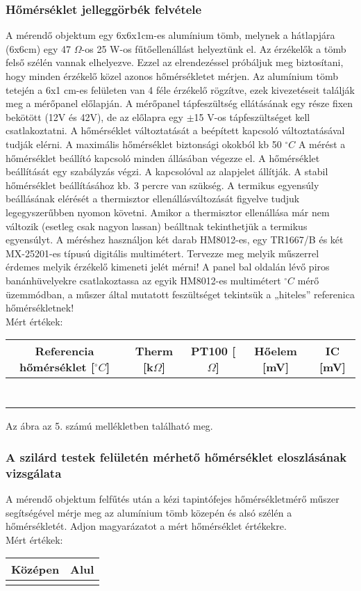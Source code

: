 \documentclass[10pt,a4paper]{article}
\begin{document}
\subsubsection{Hőmérséklet jelleggörbék felvétele}
A mérendő objektum egy 6x6x1cm-es alumínium tömb, melynek
a hátlapjára (6x6cm) egy 47 $\Omega$-os 25 W-os fűtőellenállást
helyeztünk el.
Az érzékelők a tömb felső szélén vannak elhelyezve. Ezzel az
elrendezéssel próbáljuk meg biztosítani, hogy minden érzékelő
közel azonos hőmérsékletet mérjen.
Az alumínium tömb tetején a 6x1 cm-es felületen van 4 féle
érzékelő rögzítve, ezek kivezetéseit találják meg a mérőpanel
előlapján.
A mérőpanel tápfeszültség ellátásának egy része fixen bekötött
(12V és 42V), de az előlapra egy $\pm$15 V-os tápfeszültséget kell
csatlakoztatni.
A hőmérséklet változtatását a beépített kapcsoló változtatásával
tudják elérni.
A maximális hőmérséklet biztonsági okokból kb 50 $^{\circ}C$
A mérést a hőmérséklet beállító kapcsoló minden állásában
végezze el. A hőmérséklet beállítását egy szabályzás végzi. A
kapcsolóval az alapjelet állítják. A stabil hőmérséklet
beállításához kb. 3 percre van szükség. A termikus egyensúly
beállásának elérését a thermisztor ellenállásváltozását figyelve
tudjuk legegyszerűbben nyomon követni. Amikor a thermisztor
ellenállása már nem változik (esetleg csak nagyon lassan)
beálltnak tekinthetjük a termikus egyensúlyt.
A méréshez használjon két darab HM8012-es, egy TR1667/B és
két MX-25201-es típusú digitális multimétert.
Tervezze meg melyik műszerrel érdemes melyik érzékelő kimeneti
jelét mérni! A panel bal oldalán lévő piros banánhüvelyekre csatlakoztassa az
egyik HM8012-es multimétert $^{\circ}C$ mérő üzemmódban, a műszer
által mutatott feszültséget tekintsük a „hiteles” referenica
hőmérsékletnek!
$$$$Mért értékek:$$$$\begin{tabular}{|c|c|c|c|c|}
\hline 
Referencia hőmérséklet [$^{\circ}C$] & Therm [k$\Omega$] & PT100 [$\Omega$] & Hőelem [mV] & IC [mV] \\ 
\hline 
 &  &  &  &  \\ 
\hline 
 &  &  &  &  \\ 
\hline 
 &  &  &  &  \\ 
\hline 
 &  &  &  &  \\ 
\hline 
 &  &  &  &  \\ 
\hline 
 &  &  &  &  \\ 
\hline 
 &  &  &  &  \\ 
\hline 
\end{tabular} $$$$Az ábra az 5. számú mellékletben található meg.
\subsubsection{A szilárd testek felületén mérhető hőmérséklet eloszlásának vizsgálata}
A mérendő objektum felfűtés után a kézi tapintófejes
hőmérsékletmérő műszer segítségével mérje meg az alumínium
tömb közepén és alsó szélén a hőmérsékletét.
Adjon magyarázatot a mért hőmérséklet értékekre.$$$$Mért értékek:$$$$\begin{tabular}{|c|c|}
\hline 
Középen & Alul \\ 
\hline 
 &  \\ 
\hline 
\end{tabular} 
\end{document}
